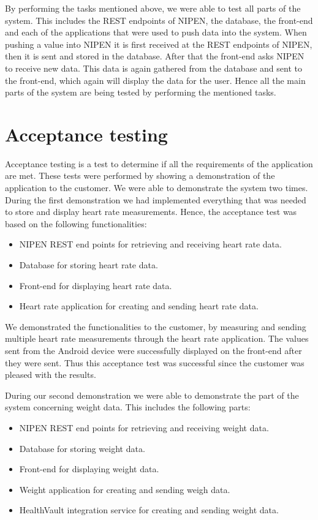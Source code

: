 By performing the tasks mentioned above, we were able to test all parts of the system.
This includes the REST endpoints of NIPEN, the database, the front-end and each of the applications that were used to push data into the system.
When pushing a value into NIPEN it is first received at the REST endpoints of NIPEN, then it is sent and stored in the database.
After that the front-end asks NIPEN to receive new data.
This data is again gathered from the database and sent to the front-end, which again will display the data for the user.
Hence all the main parts of the system are being tested by performing the mentioned tasks.

\section{Acceptance testing}

Acceptance testing is a test to determine if all the requirements of the application are met.
These tests were performed by showing a demonstration of the application to the customer.
We were able to demonstrate the system two times.
During the first demonstration we had implemented everything that was needed to store and display heart rate measurements.
Hence, the acceptance test was based on the following functionalities:

\begin{itemize}
\item NIPEN REST end points for retrieving and receiving heart rate data.
\item Database for storing heart rate data.
\item Front-end for displaying heart rate data.
\item Heart rate application for creating and sending heart rate data.
\end{itemize}

We demonstrated the functionalities to the customer, by measuring and sending multiple heart rate measurements through the heart rate application.
The values sent from the Android device were successfully displayed on the front-end after they were sent.
Thus this acceptance test was successful since the customer was pleased with the results.

During our second demonstration we were able to demonstrate the part of the system concerning weight data.
This includes the following parts:

\begin{itemize}
\item NIPEN REST end points for retrieving and receiving weight data.
\item Database for storing weight data.
\item Front-end for displaying weight data.
\item Weight application for creating and sending weigh data.
\item HealthVault integration service for creating and sending weight data.
\end{itemize}

